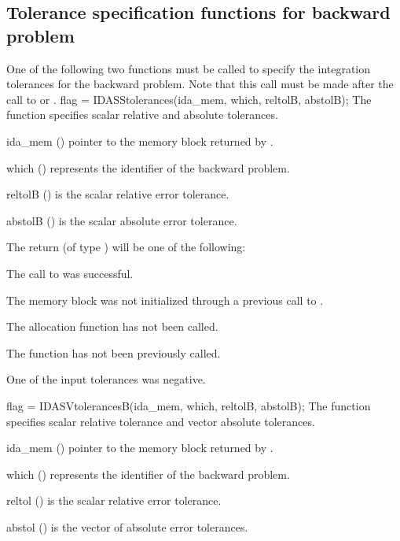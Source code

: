 \subsection{Tolerance specification functions for backward problem}
\label{sss:idatolerances_b}
One of the following two functions must be called to specify the integration
tolerances for the backward problem. Note that this call must be made after the
call to  or .
{
  flag = IDASStolerances(ida\_mem, which, reltolB, abstolB);
}
{
  The function  specifies scalar relative and absolute
  tolerances.
}
{
  \begin{args}
  \item[ida\_mem] ()
    pointer to the {\idas} memory block returned by .
  \item[which] ()
    represents the identifier of the backward problem.
  \item[reltolB] ()
    is the scalar relative error tolerance.
  \item[abstolB] ()
    is the scalar absolute error tolerance.
  \end{args}
}
{
  The return  (of type ) will be one of the following:
  \begin{args}
  \item[\Id{IDA\_SUCCESS}]
    The call to  was successful.
  \item[\Id{IDA\_MEM\_NULL}]
    The {\idas} memory block was not initialized through a previous call to
    .
  \item[\Id{IDA\_NO\_MALLOC}]
    The allocation function  has not been called.
  \item[\Id{IDA\_NO\_ADJ}]
    The function  has not been previously called.
  \item[\Id{IDA\_ILL\_INPUT}]
    One of the input tolerances was negative.
  \end{args}
}
{}
{
  flag = IDASVtolerancesB(ida\_mem, which, reltolB, abstolB);
}
{
  The function  specifies scalar relative tolerance and
  vector absolute tolerances.
}
{
  \begin{args}
  \item[ida\_mem] ()
    pointer to the {\idas} memory block returned by .
  \item[which] ()
    represents the identifier of the backward problem.
  \item[reltol] ()
    is the scalar relative error tolerance.
  \item[abstol] ()
    is the vector of absolute error tolerances.
  \end{args}
}
